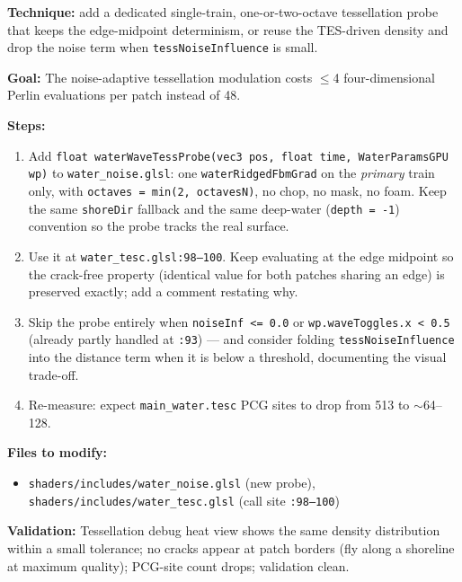 \documentclass[11pt,a4paper]{article}
\begin{document}
\textbf{Technique:} add a dedicated single-train, one-or-two-octave tessellation probe that keeps the edge-midpoint
determinism, or reuse the TES-driven density and drop the noise term when \texttt{tessNoiseInfluence} is small.

\begin{tcolorbox}[promptbox={Prompt: Replace the TCS Wave Probe with a Single-Train, Low-Octave Estimate}]
\textbf{Goal:} The noise-adaptive tessellation modulation costs $\leq$4 four-dimensional Perlin evaluations per patch
instead of 48.

\textbf{Steps:}
\begin{enumerate}
    \item Add \texttt{float waterWaveTessProbe(vec3 pos, float time, WaterParamsGPU wp)} to
    \texttt{water\_noise.glsl}: one \texttt{waterRidgedFbmGrad} on the \emph{primary} train only, with
    \texttt{octaves = min(2, octavesN)}, no chop, no mask, no foam. Keep the same \texttt{shoreDir} fallback and the same
    deep-water (\texttt{depth = -1}) convention so the probe tracks the real surface.
    \item Use it at \texttt{water\_tesc.glsl:98--100}. Keep evaluating at the edge midpoint so the crack-free property
    (identical value for both patches sharing an edge) is preserved exactly; add a comment restating why.
    \item Skip the probe entirely when \texttt{noiseInf <= 0.0} or \texttt{wp.waveToggles.x < 0.5} (already partly
    handled at \texttt{:93}) --- and consider folding \texttt{tessNoiseInfluence} into the distance term when it is
    below a threshold, documenting the visual trade-off.
    \item Re-measure: expect \texttt{main\_water.tesc} PCG sites to drop from 513 to $\sim$64--128.
\end{enumerate}

\textbf{Files to modify:}
\begin{itemize}
    \item \texttt{shaders/includes/water\_noise.glsl} (new probe), \texttt{shaders/includes/water\_tesc.glsl}
    (call site \texttt{:98--100})
\end{itemize}

\textbf{Validation:} Tessellation debug heat view shows the same density distribution within a small tolerance; no cracks
appear at patch borders (fly along a shoreline at maximum quality); PCG-site count drops; validation clean.
\end{tcolorbox}
\end{document}
